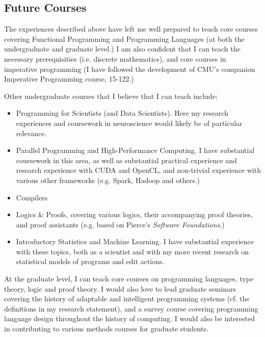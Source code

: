 \documentclass[9pt]{extarticle}
\begin{document}
\subsection*{Future Courses}
The experiences described above have left me well prepared to teach core courses covering Functional Programming and Programming Languages (at both the undergraduate and graduate level.) I am also confident that I can teach the necessary prerequisities (i.e. discrete mathematics), and core courses in imperative programming (I have followed the development of CMU's companion Imperative Programming course, 15-122.) 

Other undergraduate courses that I believe that I can teach include:
\begin{itemize}
\item Programming for Scientists (and Data Scientists). Here my research experiences and coursework in neuroscience would likely be of particular relevance.
\item Parallel Programming and High-Performance Computing. I have substantial coursework in this area, as well as substantial practical experience and research experience with CUDA and OpenCL, and non-trivial experience with various other frameworks (e.g. Spark, Hadoop and others.)
\item Compilers
\item Logics \& Proofs, covering various logics, their accompanying proof theories, and proof assistants (e.g. based on Pierce's \emph{Software Foundations}.) 
\item Introductory Statistics and Machine Learning. I have substantial experience with these topics, both as a scientist and with my more recent research on statistical models of programs and edit actions.
\end{itemize}

At the graduate level, I can teach core courses on programming languages, type theory, logic and proof theory. I would also love to lead graduate seminars covering the history of adaptable and intelligent programming systems (cf. the definitions in my research statement), and a survey course covering programming language design throughout the history of computing. I would also be interested in contributing to various methods courses for graduate students.
\end{document}
